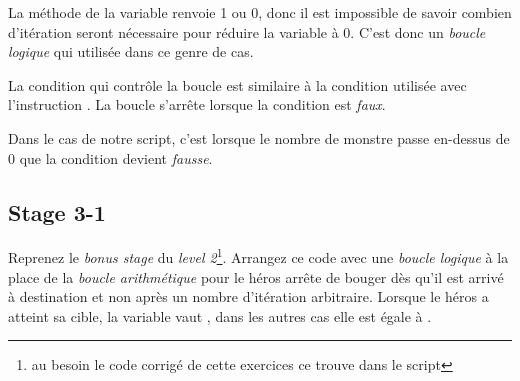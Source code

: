 La méthode  de la variable \codeintext{} renvoie 1 ou 0, donc il est impossible de savoir combien d'itération seront nécessaire pour réduire la variable  à 0.
C'est donc un \emph{boucle logique} qui utilisée dans ce genre de cas.

La condition qui contrôle la boucle est similaire à la condition utilisée avec l'instruction .
La boucle s'arrête lorsque la condition est \emph{faux}.

Dans le cas de notre script, c'est lorsque le nombre de monstre passe en-dessus de 0 que la condition devient \emph{fausse}.

\subsection{Stage 3-1}

Reprenez le \textit{bonus stage} du \textit{level 2}\footnote{au besoin le code corrigé de cette exercices ce trouve dans le script }. Arrangez ce code avec une \emph{boucle logique} à la place de la \emph{boucle arithmétique} pour le héros arrête de bouger dès qu'il est arrivé à destination et non après un nombre d'itération arbitraire.
Lorsque le héros a atteint sa cible, la variable  vaut , dans les autres cas elle est égale à .


